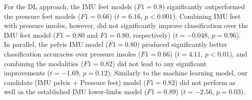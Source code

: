 \documentclass[sensors,article,submit,pdftex,moreauthors]{Definitions/mdpi}
\begin{document}
For the DL approach, the IMU feet models ($F1=0.8$) significantly outperformed the pressure feet models \textcolor{revision2}{($F1=0.66$) ($t=6.16$, $p<0.001$)}. Combining IMU feet with pressure insoles, however, did not significantly improve classification over the IMU feet model \textcolor{revision2}{($F1=0.80$} and $F1=0.80$, respectively) \textcolor{revision2}{($t=-0.048$, $p=0.96$)}. 
\textcolor{revision2}{In parallel, the pelvis IMU model ($F1=0.80$) produced significantly better classification accuracies over pressure insoles ($F1=0.66$) ($t=4.11$, $p< 0.01$), and combining the modalities ($F1=0.82$) did not lead to any significant improvements ($t=-1.69$, $p=0.12$).}         
 Similarly to the machine learning model, our \textcolor{revision2}{candidate (IMU pelvis + Pressure feet)} model ($F1=0.82$) did not perform as well as the established IMU lower-limbs model ($F1=0.89$) ($t=-2.56$, $p=0.03$). 
 




    
\end{document}

